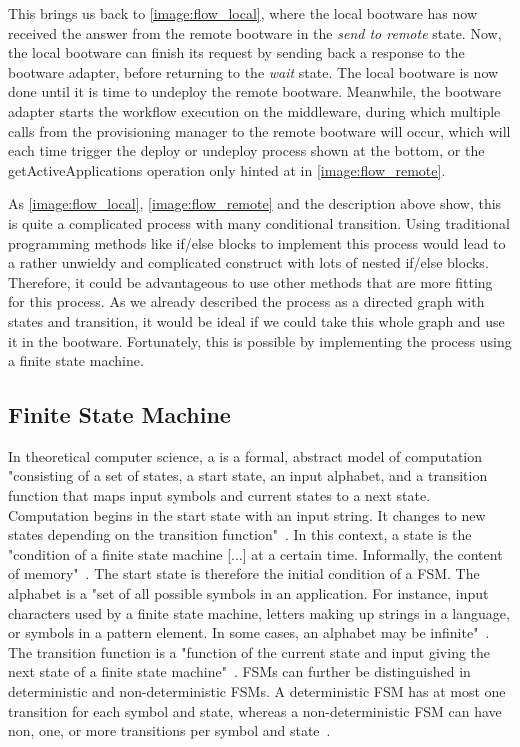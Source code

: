 This brings us back to \autoref{image:flow_local}, where the local bootware has now received the answer from the remote bootware in the \textit{send to remote} state.
Now, the local bootware can finish its request by sending back a response to the bootware adapter, before returning to the \textit{wait} state.
The local bootware is now done until it is time to undeploy the remote bootware.
Meanwhile, the bootware adapter starts the workflow execution on the middleware, during which multiple calls from the provisioning manager to the remote bootware will occur, which will each time trigger the deploy or undeploy process shown at the bottom, or the getActiveApplications operation only hinted at in \autoref{image:flow_remote}.

As \autoref{image:flow_local}, \autoref{image:flow_remote} and the description above show, this is quite a complicated process with many conditional transition.
Using traditional programming methods like if/else blocks to implement this process would lead to a rather unwieldy and complicated construct with lots of nested if/else blocks.
Therefore, it could be advantageous to use other methods that are more fitting for this process.
As we already described the process as a directed graph with states and transition, it would be ideal if we could take this whole graph and use it in the bootware.
Fortunately, this is possible by implementing the process using a finite state machine.

\subsection{Finite State Machine}

In theoretical computer science, a  is a formal, abstract model of computation "consisting of a set of states, a start state, an input alphabet, and a transition function that maps input symbols and current states to a next state. Computation begins in the start state with an input string. It changes to new states depending on the transition function"~\autocite{fsm}.
In this context, a state is the "condition of a finite state machine [...] at a certain time. Informally, the content of memory"~\autocite{state}.
The start state is therefore the initial condition of a FSM.
The alphabet is a "set of all possible symbols in an application. For instance, input characters used by a finite state machine, letters making up strings in a language, or symbols in a pattern element. In some cases, an alphabet may be infinite"~\autocite{alphabet}.
The transition function is a "function of the current state and input giving the next state of a finite state machine"~\autocite{transitionfn}.
FSMs can further be distinguished in deterministic and non-deterministic FSMs.
A deterministic FSM has at most one transition for each symbol and state, whereas a non-deterministic FSM can have non, one, or more transitions per symbol and state~\autocite{deterministic}.

